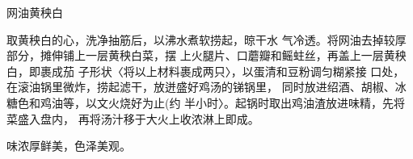 \begin{recipe}{网油黄秧白}

\ingredients






\cooking

取黄秧白的心，洗净抽筋后，以沸水煮软捞起，晾干水 气冷透。将网油去掉较厚部分，摊伸铺上一层黄秧白菜，摆 上火腿片、口蘑瓣和鳐蛀丝，再盖上一层黄秧白，即裹成茄 子形状〈将以上材料裹成两只〉，以蛋清和豆粉调匀糊紧接 口处，在滚油锅里微炸，捞起滤干，放迸盛好鸡汤的锑锅里， 同时放进绍酒、胡椒、冰糖色和鸡油等，以文火烧好为止(约 半小时〉。起锅时取出鸡油渣放进味精，先将菜盛入盘内， 再将汤汁移于大火上收浓淋上即成。

\notes

味浓厚鲜美，色泽美观。

\end{recipe}

